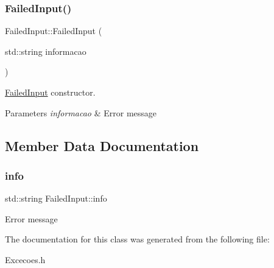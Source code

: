 \subsubsection{\texorpdfstring{Failed\+Input()}{FailedInput()}}
{\footnotesize\ttfamily Failed\+Input\+::\+Failed\+Input (\begin{DoxyParamCaption}\item[{std\+::string}]{informacao }\end{DoxyParamCaption})\hspace{0.3cm}{\ttfamily [inline]}}



\hyperlink{class_failed_input}{Failed\+Input} constructor. 


\begin{DoxyParams}{Parameters}
{\em informacao} & Error message \\
\hline
\end{DoxyParams}


\subsection{Member Data Documentation}
\mbox{\label{class_failed_input_abbd3a2cf711623b8f97f05f7168cfd38}} 
\subsubsection{\texorpdfstring{info}{info}}
{\footnotesize\ttfamily std\+::string Failed\+Input\+::info}

Error message 

The documentation for this class was generated from the following file\+:\begin{DoxyCompactItemize}
\item 
Excecoes.\+h\end{DoxyCompactItemize}
